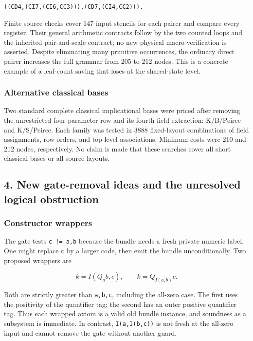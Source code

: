 \documentclass[
  11pt,
]{article}
\begin{document}
\begin{verbatim}
((CD4,(CI7,(CI6,CC3))),(CD7,(CI4,CC2))).
\end{verbatim}

Finite source checks cover 147 input stencils for each pairer and
compare every register. Their general arithmetic contracts follow by the
two counted loops and the inherited pair-and-scale contract; no new
physical macro verification is asserted. Despite eliminating many
primitive occurrences, the ordinary direct pairer increases the full
grammar from 205 to 212 nodes. This is a concrete example of a
leaf-count saving that loses at the shared-state level.

\hypertarget{alternative-classical-bases}{%
\subsubsection{Alternative classical
bases}\label{alternative-classical-bases}}

Two standard complete classical implicational bases were priced after
removing the unrestricted four-parameter row and its fourth-field
extraction: K/B/Peirce and K/S/Peirce. Each family was tested in 3888
fixed-layout combinations of field assignments, row orders, and
top-level associations. Minimum costs were 210 and 212 nodes,
respectively. No claim is made that these searches cover all short
classical bases or all source layouts.

\hypertarget{new-gate-removal-ideas-and-the-unresolved-logical-obstruction}{%
\subsection{4. New gate-removal ideas and the unresolved logical
obstruction}\label{new-gate-removal-ideas-and-the-unresolved-logical-obstruction}}

\hypertarget{constructor-wrappers}{%
\subsubsection{Constructor wrappers}\label{constructor-wrappers}}

The gate tests \texttt{c\ !=\ a,b} because the bundle needs a fresh
private numeric label. One might replace \texttt{c} by a larger code,
then emit the bundle unconditionally. Two proposed wrappers are

\[
k=I(Q_a b,c),\qquad k=Q_{I(a,b)}c.
\]

Both are strictly greater than \texttt{a,b,c}, including the all-zero
case. The first uses the positivity of the quantifier tag; the second
has an outer positive quantifier tag. Thus each wrapped axiom is a valid
old bundle instance, and soundness as a subsystem is immediate. In
contrast, \texttt{I(a,I(b,c))} is not fresh at the all-zero input and
cannot remove the gate without another guard.
\end{document}
